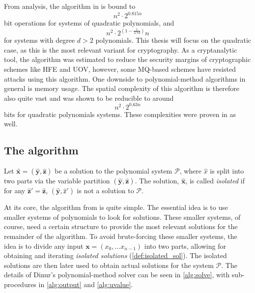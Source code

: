 From analysis, the algorithm in \cite{eurocrypt-2021-30841} is bound to 
$$
    n^2 \cdot 2^{0.815n}
$$ 
bit operations for systems of quadratic polynomials, and 
$$
    n^2 \cdot 2^{(1 - \frac{1}{2.7d})}n
$$ 
for systems with degree $d > 2$ polynomials. This thesis will focus on the quadratic case, as this is the most relevant variant for cryptography. As a cryptanalytic tool, the algorithm was estimated to reduce the security margins of cryptographic schemes like HFE and UOV, however, some MQ-based schemes have resisted attacks using this algorithm. One downside to polynomial-method algorithms in general is memory usage. The spatial complexity of this algorithm is therefore also quite vast and was shown to be reducible to around 
$$
    n^2 \cdot 2^{0.63n}
$$ 
bits for quadratic polynomials systems. These complexities were proven in \cite{eurocrypt-2021-30841} as well.

\subsection{The algorithm} \label{sec:dinur:dinur_alg}
\begin{defn} \label{def:isolated_sol}
    Let $\hat{\mathbf{x}} = (\hat{\mathbf{y}}, \hat{\mathbf{z}})$ be a solution to the polynomial system $\mathcal{P}$, where $\hat{x}$ is split into two parts via the variable partition $(\hat{\mathbf{y}}, \hat{\mathbf{z}})$. The solution, $\hat{\mathbf{x}}$, is called \textit{isolated} if for any $\hat{\mathbf{z}}' = \hat{\mathbf{z}}$, $(\hat{\mathbf{y}}, \hat{\mathbb{z}}')$ is not a solution to $\mathcal{P}$.
\end{defn}

At its core, the algorithm from \cite{eurocrypt-2021-30841} is quite simple. The essential idea is to use smaller systems of polynomials to look for solutions. These smaller systems, of course, need a certain structure to provide the most relevant solutions for the remainder of the algorithm. To avoid brute-forcing these smaller systems, the idea is to divide any input $\mathbf{x} = (x_0, \dots x_{n - 1})$ into two parts, allowing for obtaining and iterating \textit{isolated solutions} (\cref{def:isolated_sol}). The isolated solutions are then later used to obtain actual solutions for the system $\mathcal{P}$. The details of Dinur's polynomial-method solver can be seen in \cref{alg:solve}, with sub-procedures in \cref{alg:output} and \cref{alg:uvalue}.

